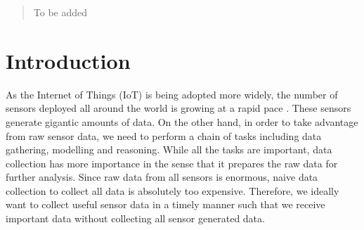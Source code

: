 \documentclass[conference]{IEEEtran}
\begin{document}




\maketitle


\begin{abstract}
To be added
\end{abstract}

\begin{IEEEkeywords}
\end{IEEEkeywords}






%
\IEEEpeerreviewmaketitle



\section{Introduction}
As the Internet of Things (IoT) is being adopted more widely, the number of sensors deployed all around the world is growing at a rapid pace \cite{perera2014}. These sensors generate gigantic amounts of data. On the other hand, in order to take advantage from raw sensor data, we need to perform a chain of tasks including data gathering, modelling and reasoning. While all the tasks are important, data collection has more importance in the sense that it prepares the raw data for further analysis. Since raw data from all sensors is enormous, naive data collection to collect all data is absolutely too expensive. Therefore, we ideally want to collect useful sensor data in a timely manner such that we receive important data without collecting all sensor generated data.
\end{document}
